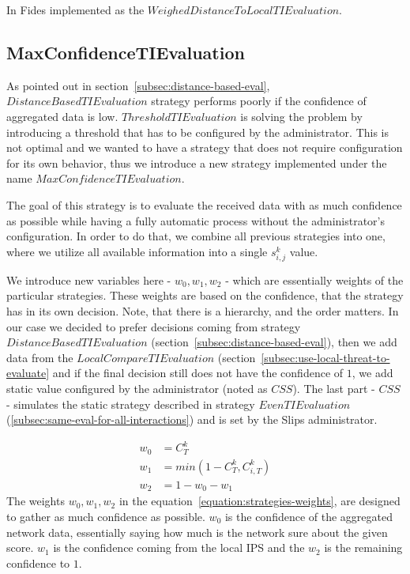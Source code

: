 \noindent
In Fides implemented as the $WeighedDistanceToLocalTIEvaluation$.

\subsection{MaxConfidenceTIEvaluation}
\label{subsec:MaxConfidenceTIEvaluation}
As pointed out in section~\ref{subsec:distance-based-eval},  $DistanceBasedTIEvaluation$ strategy performs poorly if the confidence of aggregated data is low.
$ThresholdTIEvaluation$ is solving the problem by introducing a threshold that has to be configured by the administrator. This is not optimal and we wanted to have a strategy that does not require configuration for its own behavior, thus we introduce a new strategy implemented under the name $MaxConfidenceTIEvaluation$.

The goal of this strategy is to evaluate the received data with as much confidence as possible while having a fully automatic process without the administrator's configuration.
In order to do that, we combine all previous strategies into one, where we utilize all available information into a single $s^{k}_{i, j}$ value.

We introduce new variables here - $w_{0}, w_{1}, w_{2}$ - which are essentially weights of the particular strategies. These weights are based on the confidence, that the strategy has in its own decision.
Note, that there is a hierarchy, and the order matters. 
In our case we decided to prefer decisions coming from strategy $DistanceBasedTIEvaluation$ (section~\ref{subsec:distance-based-eval}), then we add data from the $LocalCompareTIEvaluation$ (section~\ref{subsec:use-local-threat-to-evaluate} and if the final decision still does not have the confidence of $1$, we add static value configured by the administrator (noted as $CSS$). 
The last part - $CSS$ - simulates the static strategy described in strategy $EvenTIEvaluation$ (\ref{subsec:same-eval-for-all-interactions}) and is set by the Slips administrator.

\begin{equation}
\label{equation:strategies-weights}
\begin{split}
    w_{0} &= {C}^{k}_{T} \\
    w_{1} &= min(1 - {C}^{k}_{T}, {C}^{k}_{i, T}) \\
    w_{2} &= 1 - w_{0} - w_{1}
\end{split}
\end{equation}
The weights $w_{0}, w_{1}, w_{2}$ in the equation~\ref{equation:strategies-weights}, are designed to gather as much confidence as possible. $w_{0}$ is the confidence of the aggregated network data, essentially saying how much is the network sure about the given score. 
$w_{1}$ is the confidence coming from the local IPS and the $w_{2}$ is the remaining confidence to $1$.

